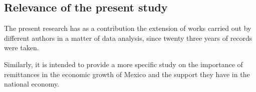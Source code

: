 \subsection{Relevance of the present study}
The present research has as a contribution the extension of works carried out by different authors in a matter of data analysis, since twenty three years of records were taken. \par Similarly, it is intended to provide a more specific study on the importance of remittances in the economic growth of Mexico and the support they have in the national economy.